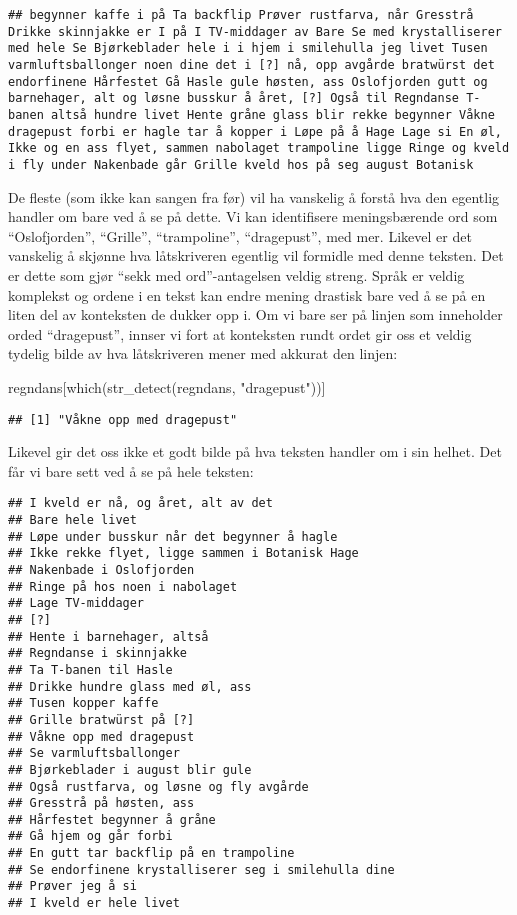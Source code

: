 \documentclass[
]{book}
\newenvironment{Shaded}{\begin{snugshade}}{\end{snugshade}}
\newcommand{\FunctionTok}[1]{\textcolor[rgb]{0.00,0.00,0.00}{#1}}
\newcommand{\NormalTok}[1]{#1}
\newcommand{\StringTok}[1]{\textcolor[rgb]{0.31,0.60,0.02}{#1}}
\begin{document}
\begin{verbatim}
## begynner kaffe i på Ta backflip Prøver rustfarva, når Gresstrå Drikke skinnjakke er I på I TV-middager av Bare Se med krystalliserer mеd hele Se Bjørkeblader hele i i hjem i smilehulla jeg livet Tusen varmluftsballonger noen dine det i [?] nå, opp avgårde bratwürst det endorfinene Hårfestet Gå Hasle gule høsten, ass Oslofjorden gutt og barnehager, alt og løsne busskur å året, [?] Også til Regndanse T-banen altså hundre livet Hente gråne glass blir rekke begynner Våkne dragepust forbi er hagle tar å koppеr i Løpe på å Hage Lage si En øl, Ikke og en ass flyet, sammen nabolaget trampoline ligge Ringe og kveld i fly under Nakenbade går Grille kveld hos på seg august Botanisk
\end{verbatim}

De fleste (som ikke kan sangen fra før) vil ha vanskelig å forstå hva den egentlig handler om bare ved å se på dette. Vi kan identifisere meningsbærende ord som ``Oslofjorden'', ``Grille'', ``trampoline'', ``dragepust'', med mer. Likevel er det vanskelig å skjønne hva låtskriveren egentlig vil formidle med denne teksten. Det er dette som gjør ``sekk med ord''-antagelsen veldig streng. Språk er veldig komplekst og ordene i en tekst kan endre mening drastisk bare ved å se på en liten del av konteksten de dukker opp i. Om vi bare ser på linjen som inneholder orded ``dragepust'', innser vi fort at konteksten rundt ordet gir oss et veldig tydelig bilde av hva låtskriveren mener med akkurat den linjen:

\begin{Shaded}
\begin{Highlighting}[]
\NormalTok{regndans[}\FunctionTok{which}\NormalTok{(}\FunctionTok{str\_detect}\NormalTok{(regndans, }\StringTok{"dragepust"}\NormalTok{))]}
\end{Highlighting}
\end{Shaded}

\begin{verbatim}
## [1] "Våkne opp mеd dragepust"
\end{verbatim}

Likevel gir det oss ikke et godt bilde på hva teksten handler om i sin helhet. Det får vi bare sett ved å se på hele teksten:

\begin{verbatim}
## I kveld er nå, og året, alt av det
## Bare hele livet
## Løpe under busskur når det begynner å hagle
## Ikke rekke flyet, ligge sammen i Botanisk Hage
## Nakenbade i Oslofjorden
## Ringe på hos noen i nabolaget
## Lage TV-middager
## [?]
## Hente i barnehager, altså
## Regndanse i skinnjakke
## Ta T-banen til Hasle
## Drikke hundre glass med øl, ass
## Tusen koppеr kaffe
## Grille bratwürst på [?]
## Våkne opp mеd dragepust
## Se varmluftsballonger
## Bjørkeblader i august blir gule
## Også rustfarva, og løsne og fly avgårde
## Gresstrå på høsten, ass
## Hårfestet begynner å gråne
## Gå hjem og går forbi
## En gutt tar backflip på en trampoline
## Se endorfinene krystalliserer seg i smilehulla dine
## Prøver jeg å si
## I kveld er hele livet
\end{verbatim}
\end{document}
